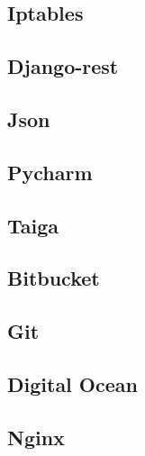 \subsection{Iptables}

\subsection{Django-rest}

\subsection{Json}

\subsection{Pycharm}

\subsection{Taiga}

\subsection{Bitbucket}

\subsection{Git}

\subsection{Digital Ocean}

\subsection{Nginx}
